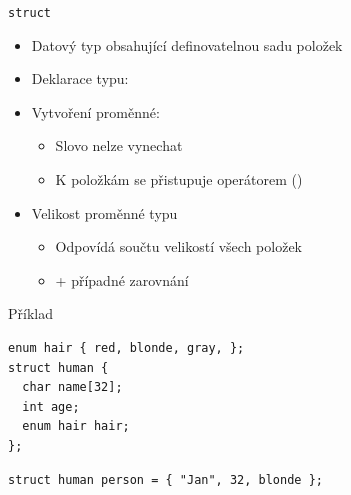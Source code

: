 \begin{frame}[fragile]{\texttt{struct}}

  \begin{itemize}
    \item Datový typ obsahující definovatelnou sadu položek

    \pause

    \item Deklarace typu: 

    \pause

    \item Vytvoření proměnné: 
    \begin{itemize}
      \item Slovo  nelze vynechat
      \item K položkám se přistupuje operátorem 
	()
    \end{itemize}

    \pause

    \item Velikost proměnné typu 
    \begin{itemize}
      \item Odpovídá součtu velikostí všech položek
      \item + případné zarovnání
    \end{itemize}

  \end{itemize}


\begin{block}{Příklad}
\begin{lstlisting}
enum hair { red, blonde, gray, };
struct human {
  char name[32];
  int age;
  enum hair hair;
};
\end{lstlisting}
\begin{lstlisting}
struct human person = { "Jan", 32, blonde };
\end{lstlisting}
\end{block}

\end{frame}

